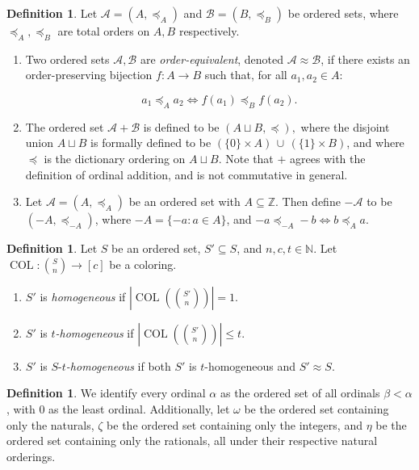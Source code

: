\documentclass[10pt,a4paper]{article}
\newcommand{\oequiv}{\approx}
\newcommand{\setconcat}{+}
\newcommand{\COL}{\operatorname{COL}}
\newcommand{\N}{\mathbb{N}}
\newcommand{\Z}{\mathbb{Z}}
\newcommand{\numpoints}{n}
\newcommand{\numcolors}{c}
\theoremstyle{plain}
\theoremstyle{definition}
\newtheorem{definition}[theorem]{Definition}
\begin{document}
\begin{definition} 
Let $\mathcal{A} = (A,\preceq_A)$ and $\mathcal{B} = (B,\preceq_B)$ be ordered sets, where
$\preceq_A, \preceq_B$ are total orders on $A, B$ respectively.

\begin{enumerate}

\item Two ordered sets
$\mathcal{A},\mathcal{B}$ are \textit{order-equivalent}, denoted $\mathcal{A}\oequiv \mathcal{B}$, 
if there exists an order-preserving bijection $f\colon A \to B$ such that, for all $a_1, a_2 \in A$: 

$$a_1 \preceq_A a_2 \iff f(a_1) \preceq_B f(a_2).$$

\item 
The ordered set $\mathcal{A} \setconcat \mathcal{B}$ is defined to be
$(A\sqcup B, \preceq),$ where the disjoint union $A\sqcup B$ is formally defined to be
$(\{0\} \times A) \, \cup\, (\{1\} \times B)$, and where $\preceq$ is the dictionary ordering on $A\sqcup B.$
Note that $\setconcat$ agrees with the definition of ordinal addition, and is not commutative in general.

\item 
Let $\mathcal{A}=(A,\preceq_A)$ be an ordered set with $A \subseteq \Z$. Then define $-\mathcal{A}$ to be $(-A,\preceq_{-A})$, where 
$-A = \{ -a \colon a \in A\}$, and
$-a \preceq_{-A} -b \iff b \preceq_{A} a$.
\end{enumerate} 

\end{definition} 

\begin{definition}\label{def:homogeneous}
Let $S$ be an ordered set, $S'\subseteq S$, and $\numpoints,\numcolors,t \in \N.$ Let $\COL \colon \binom{S}{\numpoints} \to [\numcolors]$ be a coloring.
\begin{enumerate}
    \item 
$S'$ is \textit{homogeneous} if  $\left|\COL\left(\binom{S'}{\numpoints}\right)\right|= 1$. 
\item 
 $S'$ is \textit{$t$-homogeneous} if $\left|\COL\left(\binom{S'}{\numpoints}\right)\right|\leq t$. 
 \item 
$S'$ is $S$-\textit{$t$-homogeneous} if both $S'$ is $t$-homogeneous and $S'\oequiv S$.
\end{enumerate}
\end{definition}

\begin{definition}
We identify every ordinal $\alpha$ as the ordered set of all ordinals $\beta < \alpha$, with 0 as the least ordinal. Additionally, let $\omega$ be the ordered set containing only the naturals, $\zeta$ be the ordered set containing only the integers, and $\eta$ be the ordered set containing only the rationals, all under their respective natural orderings.

\end{definition}
\end{document}
